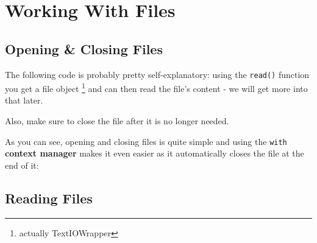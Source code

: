 \section{Working With Files}

  \subsection{Opening \& Closing Files}
  The following code is probably pretty self-explanatory:
  using the \texttt{read()} function you get a file object
  \footnote{actually TextIOWrapper} and can then read the file's content
  - we will get more into that later.

  Also, make sure to close the file after it is no longer needed.
  

  As you can see, opening and closing files is quite simple and using the 
  \texttt{with} \textbf{context manager} makes it even easier as it automatically
  closes the file at the end of it:



  \subsection{Reading Files}

